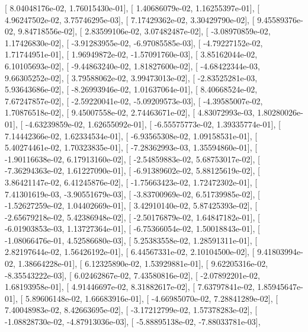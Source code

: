 \documentclass{article}
\begin{document}
       [  8.04048176e-02,   1.76015430e-01],
       [  1.40686079e-02,   1.16255397e-01],
       [  4.96247502e-02,   3.75746295e-03],
       [  7.17429362e-02,   3.30429790e-02],
       [  9.45589376e-02,   9.84718556e-02],
       [  2.83599106e-02,   3.07482487e-02],
       [ -3.08970859e-02,   1.17426830e-02],
       [ -3.91283955e-02,  -6.97085585e-03],
       [ -4.79227152e-02,   1.71744951e-01],
       [  1.96949872e-02,  -1.57091760e-03],
       [  3.85162044e-02,   6.10105693e-02],
       [ -9.44863240e-02,   1.81827600e-02],
       [ -4.68422344e-03,   9.66305252e-02],
       [  3.79588062e-02,   3.99473013e-02],
       [ -2.83525281e-03,   5.93643686e-02],
       [ -8.26993946e-02,   1.01637064e-01],
       [  8.40668524e-02,   7.67247857e-02],
       [ -2.59220041e-02,  -5.09209573e-03],
       [ -4.39585007e-02,   1.70876518e-02],
       [  9.45007558e-02,   2.74463671e-02],
       [  4.83072993e-03,   1.80280026e-01],
       [ -4.63239859e-02,   1.62655092e-01],
       [ -6.55575773e-02,   1.39335774e-01],
       [  7.14442366e-02,   1.62334534e-01],
       [ -6.93565308e-02,   1.09158531e-01],
       [  5.40274461e-02,   1.70323835e-01],
       [ -7.28362993e-03,   1.35594860e-01],
       [ -1.90116638e-02,   6.17913160e-02],
       [ -2.54859883e-02,   5.68753017e-02],
       [ -7.36294363e-02,   1.61227090e-01],
       [ -6.91389602e-02,   5.88125619e-02],
       [  3.86421147e-02,   6.41245876e-02],
       [ -1.75663423e-02,   1.72472302e-01],
       [  7.41301619e-03,  -3.90551679e-03],
       [ -3.83700969e-02,   6.51739985e-02],
       [ -1.52627259e-02,   1.04402669e-01],
       [  3.42910140e-02,   5.87425393e-02],
       [ -2.65679218e-02,   5.42386948e-02],
       [ -2.50176879e-02,   1.64847182e-01],
       [ -6.01903853e-03,   1.13727364e-01],
       [ -6.75366054e-02,   1.50018843e-01],
       [ -1.08066476e-01,   4.52586680e-03],
       [  5.25383558e-02,   1.28591311e-01],
       [  2.82197644e-02,   1.56426192e-01],
       [  6.44567331e-02,   2.10104500e-02],
       [  9.41803994e-02,   1.38664228e-01],
       [  6.12325890e-02,   1.53929881e-01],
       [  9.62205316e-02,  -8.35543222e-03],
       [  6.02462867e-02,   7.43580816e-02],
       [ -2.07892201e-02,   1.68193958e-01],
       [  4.91446697e-02,   8.31882617e-02],
       [  7.63797841e-02,   1.85945647e-01],
       [  5.89606148e-02,   1.66683916e-01],
       [ -4.66985070e-02,   7.28841289e-02],
       [  7.40048983e-02,   8.42663695e-02],
       [ -3.17212799e-02,   1.57378283e-02],
       [ -1.08828730e-02,  -4.87913036e-03],
       [ -5.88895138e-02,  -7.88033781e-03],
\end{document}
